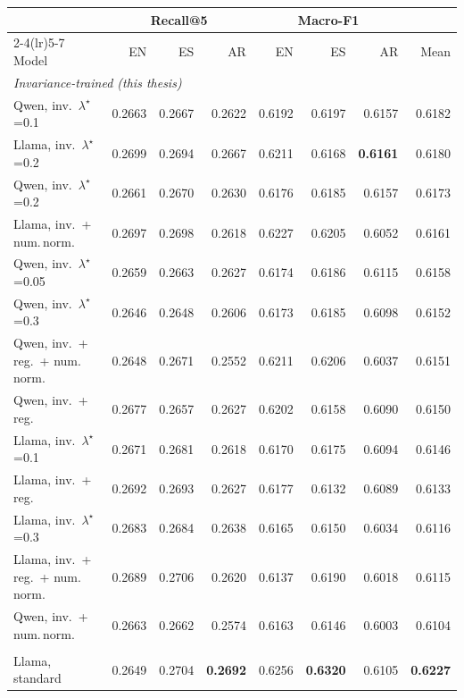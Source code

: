 \begin{table}[H]
\centering\footnotesize\setlength{\tabcolsep}{4.2pt}\renewcommand{\arraystretch}{0.93}
\begin{tabular}{l rrr rrr r}
\toprule
& \multicolumn{3}{c}{Recall@5} & \multicolumn{3}{c}{Macro-F1} & \\
\cmidrule(lr){2-4}\cmidrule(lr){5-7}
Model & EN & ES & AR & EN & ES & AR & Mean \\
\midrule
\multicolumn{8}{l}{\itshape Invariance-trained (this thesis)}\\
\quad Qwen, inv.\ $\lambda^\star$=0.1 & 0.2663 & 0.2667 & 0.2622 & 0.6192 & 0.6197 & 0.6157 & 0.6182 \\
\quad Llama, inv.\ $\lambda^\star$=0.2 & 0.2699 & 0.2694 & 0.2667 & 0.6211 & 0.6168 & \textbf{0.6161} & 0.6180 \\
\quad Qwen, inv.\ $\lambda^\star$=0.2 & 0.2661 & 0.2670 & 0.2630 & 0.6176 & 0.6185 & 0.6157 & 0.6173 \\
\quad Llama, inv.\ + num.\,norm. & 0.2697 & 0.2698 & 0.2618 & 0.6227 & 0.6205 & 0.6052 & 0.6161 \\
\quad Qwen, inv.\ $\lambda^\star$=0.05 & 0.2659 & 0.2663 & 0.2627 & 0.6174 & 0.6186 & 0.6115 & 0.6158 \\
\quad Qwen, inv.\ $\lambda^\star$=0.3 & 0.2646 & 0.2648 & 0.2606 & 0.6173 & 0.6185 & 0.6098 & 0.6152 \\
\quad Qwen, inv.\ + reg.\ + num.\,norm. & 0.2648 & 0.2671 & 0.2552 & 0.6211 & 0.6206 & 0.6037 & 0.6151 \\
\quad Qwen, inv.\ + reg. & 0.2677 & 0.2657 & 0.2627 & 0.6202 & 0.6158 & 0.6090 & 0.6150 \\
\quad Llama, inv.\ $\lambda^\star$=0.1 & 0.2671 & 0.2681 & 0.2618 & 0.6170 & 0.6175 & 0.6094 & 0.6146 \\
\quad Llama, inv.\ + reg. & 0.2692 & 0.2693 & 0.2627 & 0.6177 & 0.6132 & 0.6089 & 0.6133 \\
\quad Llama, inv.\ $\lambda^\star$=0.3 & 0.2683 & 0.2684 & 0.2638 & 0.6165 & 0.6150 & 0.6034 & 0.6116 \\
\quad Llama, inv.\ + reg.\ + num.\,norm. & 0.2689 & 0.2706 & 0.2620 & 0.6137 & 0.6190 & 0.6018 & 0.6115 \\
\quad Qwen, inv.\ + num.\,norm. & 0.2663 & 0.2662 & 0.2574 & 0.6163 & 0.6146 & 0.6003 & 0.6104 \\
\addlinespace[3pt]
\multicolumn{8}{l}{\itshape Standard multilingual fine-tuning}\\
\quad Llama, standard & 0.2649 & 0.2704 & \textbf{0.2692} & 0.6256 & \textbf{0.6320} & 0.6105 & \textbf{0.6227} \\

\end{tabular}
\end{table}
